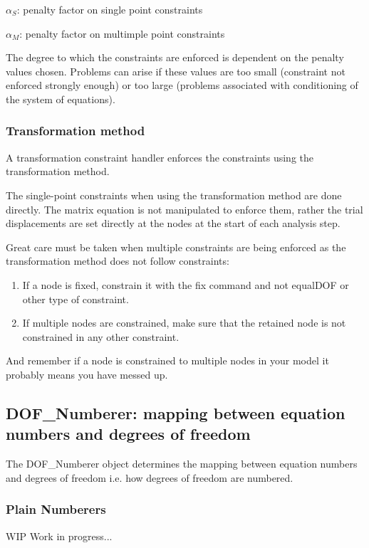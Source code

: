 \begin{description}
  \item{$\alpha_S$}: penalty factor on single point constraints
  \item{$\alpha_M$}: penalty factor on multimple point constraints
\end{description}

The degree to which the constraints are enforced is dependent on the penalty values chosen. Problems can arise if these values are too small (constraint not enforced strongly enough) or too large (problems associated with conditioning of the system of equations).

\subsubsection{Transformation method}
A transformation constraint handler enforces the constraints using the transformation method.

The single-point constraints when using the transformation method are done directly. The matrix equation is not manipulated to enforce them, rather the trial displacements are set directly at the nodes at the start of each analysis step.

Great care must be taken when multiple constraints are being enforced as the transformation method does not follow constraints: 

\begin{enumerate}
\item If a node is fixed, constrain it with the fix command and not equalDOF or other type of constraint.
\item If multiple nodes are constrained, make sure that the retained node is not constrained in any other constraint.
\end{enumerate}

And remember if a node is constrained to multiple nodes in your model it probably means you have messed up. 

\subsection{DOF\_Numberer: mapping between equation numbers and degrees of freedom}
The DOF\_Numberer object determines the mapping between equation numbers and degrees of freedom i.e. how degrees of freedom are numbered.

\subsubsection{Plain Numberers}
WIP Work in progress...

